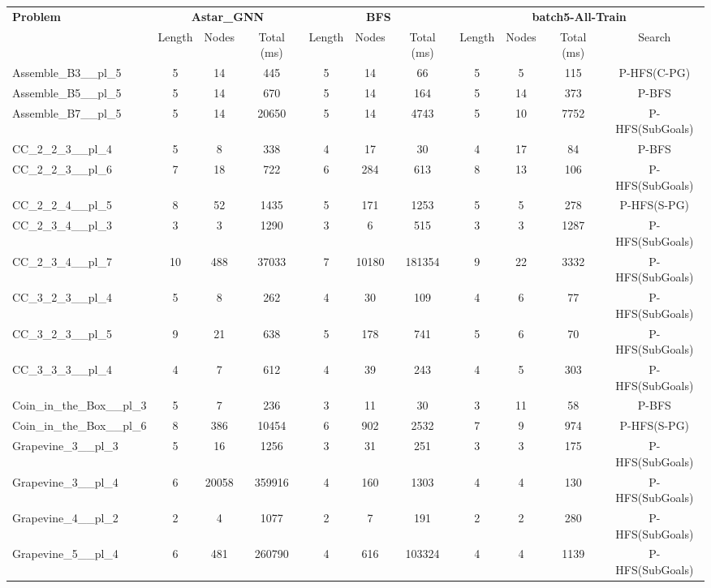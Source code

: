 \begin{table}[!ht]
\centering
\scriptsize
\begin{tabular}{l|ccc|ccc|cccc}
\multirow{2}{*}{\textbf{Problem}} & \multicolumn{3}{c|}{\textbf{Astar\_GNN}} & \multicolumn{3}{c|}{\textbf{BFS}} & \multicolumn{4}{c}{\textbf{batch5-All-Train}} \\
\cline{2-11}
& Length & Nodes & Total (ms) & Length & Nodes & Total (ms) & Length & Nodes & Total (ms) & Search \\
\hline
Assemble\_B3\_\_pl\_5 & 5 & 14 & 445 & 5 & 14 & 66 & 5 & 5 & 115 & P-HFS(C-PG) \\
Assemble\_B5\_\_pl\_5 & 5 & 14 & 670 & 5 & 14 & 164 & 5 & 14 & 373 & P-BFS \\
Assemble\_B7\_\_pl\_5 & 5 & 14 & 20650 & 5 & 14 & 4743 & 5 & 10 & 7752 & P-HFS(SubGoals) \\
CC\_2\_2\_3\_\_pl\_4 & 5 & 8 & 338 & 4 & 17 & 30 & 4 & 17 & 84 & P-BFS \\
CC\_2\_2\_3\_\_pl\_6 & 7 & 18 & 722 & 6 & 284 & 613 & 8 & 13 & 106 & P-HFS(SubGoals) \\
CC\_2\_2\_4\_\_pl\_5 & 8 & 52 & 1435 & 5 & 171 & 1253 & 5 & 5 & 278 & P-HFS(S-PG) \\
CC\_2\_3\_4\_\_pl\_3 & 3 & 3 & 1290 & 3 & 6 & 515 & 3 & 3 & 1287 & P-HFS(SubGoals) \\
CC\_2\_3\_4\_\_pl\_7 & 10 & 488 & 37033 & 7 & 10180 & 181354 & 9 & 22 & 3332 & P-HFS(SubGoals) \\
CC\_3\_2\_3\_\_pl\_4 & 5 & 8 & 262 & 4 & 30 & 109 & 4 & 6 & 77 & P-HFS(SubGoals) \\
CC\_3\_2\_3\_\_pl\_5 & 9 & 21 & 638 & 5 & 178 & 741 & 5 & 6 & 70 & P-HFS(SubGoals) \\
CC\_3\_3\_3\_\_pl\_4 & 4 & 7 & 612 & 4 & 39 & 243 & 4 & 5 & 303 & P-HFS(SubGoals) \\
Coin\_in\_the\_Box\_\_pl\_3 & 5 & 7 & 236 & 3 & 11 & 30 & 3 & 11 & 58 & P-BFS \\
Coin\_in\_the\_Box\_\_pl\_6 & 8 & 386 & 10454 & 6 & 902 & 2532 & 7 & 9 & 974 & P-HFS(S-PG) \\
Grapevine\_3\_\_pl\_3 & 5 & 16 & 1256 & 3 & 31 & 251 & 3 & 3 & 175 & P-HFS(SubGoals) \\
Grapevine\_3\_\_pl\_4 & 6 & 20058 & 359916 & 4 & 160 & 1303 & 4 & 4 & 130 & P-HFS(SubGoals) \\
Grapevine\_4\_\_pl\_2 & 2 & 4 & 1077 & 2 & 7 & 191 & 2 & 2 & 280 & P-HFS(SubGoals) \\
Grapevine\_5\_\_pl\_4 & 6 & 481 & 260790 & 4 & 616 & 103324 & 4 & 4 & 1139 & P-HFS(SubGoals) \\

\end{tabular}
\end{table}
